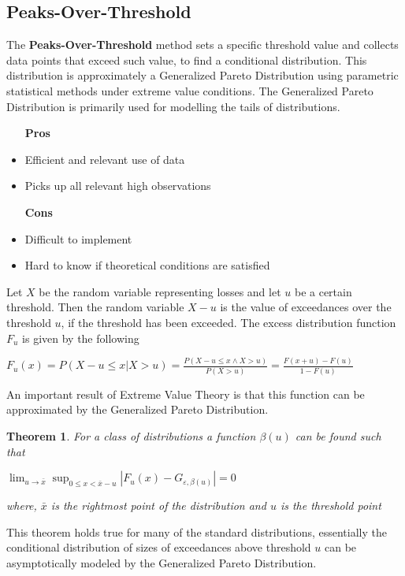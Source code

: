 \documentclass[11pt,a4paper]{article}
\theoremstyle{plain}
\newtheorem{thm}[fact]{Theorem}
\begin{document}
\newpage
\subsection{Peaks-Over-Threshold}
The \textbf{Peaks-Over-Threshold} method sets a specific threshold value and collects data points that exceed such value, to find a conditional distribution. This distribution is approximately a Generalized Pareto Distribution using parametric statistical methods under extreme value conditions. The Generalized Pareto Distribution is primarily used for modelling the tails of distributions. 

\begin{itemize}
\item [\textbf{Pros}]
\item  Efficient and relevant use of data
\item Picks up all relevant high observations
\item [\textbf{Cons}]
\item Difficult to implement
\item Hard to know if theoretical conditions are satisfied
\end{itemize}

Let $X$ be the random variable representing losses and let $u$ be a certain threshold. Then the random variable $X-u$ is the value of exceedances over the threshold $u$, if the threshold has been exceeded. The excess distribution function $F_u$ is given by the following
\begin{center}
$F_u(x)=P(X-u\leq x|X>u)=\frac{P(X-u \leq x \land X>u)}{P(X>u)}=\frac{F(x+u)-F(u)}{1-F(u)} $
\end{center}

An important result of Extreme Value Theory is that this function can be approximated by the Generalized Pareto Distribution.

\begin{thm}
For a 
class of distributions a function $\beta(u)$ can be found such that 
\begin{center}
$\lim_{u\rightarrow \bar{x}} \sup_{0\leq x < \bar{x}-u}|F_u(x)-G_{\varepsilon, \beta(u)}|=0$
\end{center}
where, $\bar{x}$ is the rightmost point of the distribution and $u$ is the threshold point
\end{thm}

This theorem holds true for many of the standard distributions, essentially the conditional distribution of sizes of exceedances above threshold $u$ can be asymptotically modeled by the Generalized Pareto Distribution.
\end{document}
